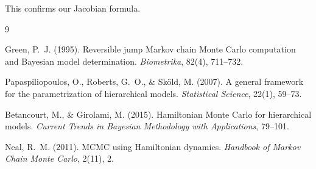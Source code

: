 \documentclass[11pt,a4paper]{article}
\theoremstyle{definition}
\begin{document}
This confirms our Jacobian formula.

\begin{thebibliography}{9}

Green, P.~J. (1995).
Reversible jump Markov chain Monte Carlo computation and Bayesian model determination.
\emph{Biometrika}, 82(4), 711--732.

Papaspiliopoulos, O., Roberts, G.~O., \& Sk\"old, M. (2007).
A general framework for the parametrization of hierarchical models.
\emph{Statistical Science}, 22(1), 59--73.

Betancourt, M., \& Girolami, M. (2015).
Hamiltonian Monte Carlo for hierarchical models.
\emph{Current Trends in Bayesian Methodology with Applications}, 79--101.

Neal, R.~M. (2011).
MCMC using Hamiltonian dynamics.
\emph{Handbook of Markov Chain Monte Carlo}, 2(11), 2.

\end{thebibliography}
\end{document}
